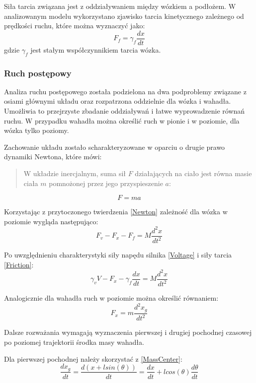 \documentclass[12pt, oneside]{report}
\theoremstyle{definition}
\begin{document}
\newpage
Siła tarcia związana jest z oddziaływaniem między wózkiem a podłożem. W analizowanym modelu wykorzystano zjawisko tarcia kinetycznego zależnego od prędkości ruchu, które można wyznaczyć jako:
\begin{equation} \label{Friction}
F_f = \gamma_f \frac{dx}{dt}
\end{equation}
gdzie $\gamma_f$ jest stałym współczynnikiem tarcia wózka.

\subsubsection{Ruch postępowy}
Analiza ruchu postępowego została podzielona na dwa podproblemy związane z osiami głównymi układu oraz rozpatrzona oddzielnie dla wózka i wahadła. Umożliwia to przejrzyste zbadanie oddziaływań i łatwe wyprowadzenie równań ruchu. W przypadku wahadła można określić ruch w pionie i w poziomie, dla wózka tylko poziomy. 

Zachowanie układu zostało scharakteryzowane w oparciu o drugie prawo dynamiki Newtona, które mówi:
\begin{quote}
W układzie inercjalnym, suma sił $F$ działających na ciało jest równa masie ciała $m$ pomnożonej przez jego przyspieszenie $a$:
\end{quote}
\begin{equation} \label{Newton}
F = ma
\end{equation}

Korzystając z przytoczonego twierdzenia \ref{Newton} zależność dla wózka w poziomie wygląda następująco:
\begin{equation}
F_v - F_x - F_f = M \frac{d^2x}{dt^2}
\end{equation}

Po uwzględnieniu charakterystyki siły napędu silnika \ref{Voltage} i siły tarcia \ref{Friction}:
\begin{equation} \label{CartX}
\gamma_v V - F_x - \gamma_f \frac{dx}{dt} = M \frac{d^2x}{dt^2}
\end{equation}

Analogicznie dla wahadła ruch w poziomie można określić równaniem:
\begin{equation} \label{PendulumX}
F_x = m \frac{d^2x_g}{dt^2}
\end{equation}

Dalsze rozważania wymagają wyznaczenia pierwszej i drugiej pochodnej czasowej po poziomej trajektorii środka masy wahadła.

Dla pierwszej pochodnej należy skorzystać z \ref{MassCenter}:
\begin{equation} \label{FirstDerivative}
\frac{dx_g}{dt} = \frac{d(x + lsin(\theta))}{dt} = \frac{dx}{dt} + lcos(\theta)\frac{d\theta}{dt}
\end{equation}
\end{document}
